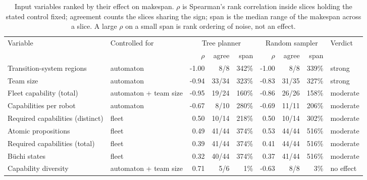 \begin{table}[htbp]
\centering
\caption{Input variables ranked by their effect on makespan. $\rho$ is Spearman's rank correlation inside slices holding the stated control fixed; agreement counts the slices sharing the sign; span is the median range of the makespan across a slice. A large $\rho$ on a small span is rank ordering of noise, not an effect.}
\label{tab:makespan_drivers}
\small
\begin{tabular}{llrrrrrrl}
\toprule
Variable & Controlled for & \multicolumn{3}{c}{Tree planner} & \multicolumn{3}{c}{Random sampler} & Verdict \\
\cmidrule(lr){3-5}\cmidrule(lr){6-8}
 & & $\rho$ & agree & span & $\rho$ & agree & span & \\
\midrule
Transition-system regions & automaton & -1.00 & 8/8 & 342\% & -1.00 & 8/8 & 339\% & strong \\
Team size & automaton & -0.94 & 33/34 & 323\% & -0.83 & 31/35 & 327\% & strong \\
Fleet capability (total) & automaton + team size & -0.95 & 19/24 & 160\% & -0.86 & 26/26 & 158\% & moderate \\
Capabilities per robot & automaton & -0.67 & 8/10 & 280\% & -0.69 & 11/11 & 206\% & moderate \\
Required capabilities (distinct) & fleet & 0.50 & 10/14 & 218\% & 0.50 & 10/14 & 302\% & moderate \\
Atomic propositions & fleet & 0.49 & 41/44 & 374\% & 0.53 & 44/44 & 516\% & moderate \\
Required capabilities (total) & fleet & 0.39 & 41/44 & 374\% & 0.41 & 44/44 & 516\% & moderate \\
B\"uchi states & fleet & 0.32 & 40/44 & 374\% & 0.37 & 41/44 & 516\% & moderate \\
Capability diversity & automaton + team size & 0.71 & 5/6 & 1\% & -0.63 & 8/8 & 3\% & no effect \\
\bottomrule
\end{tabular}
\end{table}

